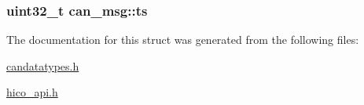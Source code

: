 \subsubsection[{\texorpdfstring{ts}{ts}}]{\setlength{\rightskip}{0pt plus 5cm}uint32\+\_\+t can\+\_\+msg\+::ts}\hypertarget{structcan__msg_a157aaad2daf039f59606522c6a51663a}{}\label{structcan__msg_a157aaad2daf039f59606522c6a51663a}


The documentation for this struct was generated from the following files\+:\begin{DoxyCompactItemize}
\item 
\hyperlink{candatatypes_8h}{candatatypes.\+h}\item 
\hyperlink{hico__api_8h}{hico\+\_\+api.\+h}\end{DoxyCompactItemize}
